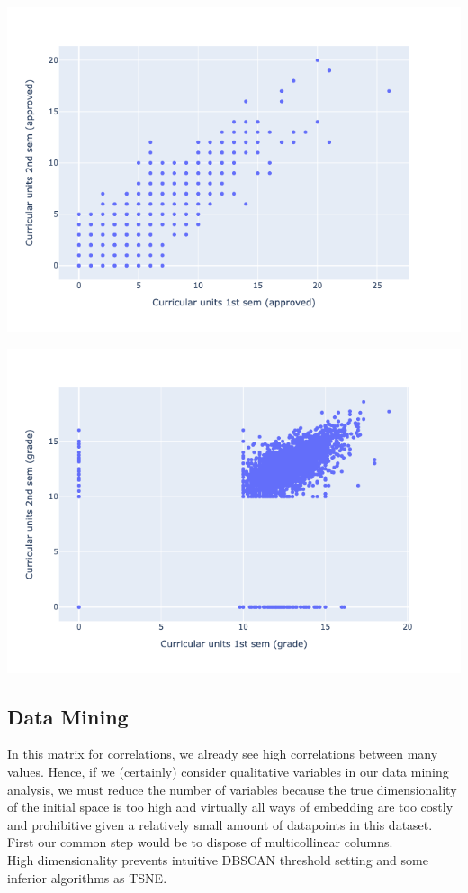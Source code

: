 \documentclass[
  letterpaper,
  DIV=11,
  numbers=noendperiod]{scrartcl}
\begin{document}
\includegraphics{report_AzadhdhinNedalYunisAlFraijat_files/figure-pdf/cell-56-output-1.png}

\includegraphics{report_AzadhdhinNedalYunisAlFraijat_files/figure-pdf/cell-57-output-1.png}

\hypertarget{data-mining}{%
\subsection{Data Mining}\label{data-mining}}

In this matrix for correlations, we already see high correlations
between many values. Hence, if we (certainly) consider qualitative
variables in our data mining analysis, we must reduce the number of
variables because the true dimensionality of the initial space is too
high and virtually all ways of embedding are too costly and prohibitive
given a relatively small amount of datapoints in this dataset. First our
common step would be to dispose of multicollinear columns.\\
High dimensionality prevents intuitive DBSCAN threshold setting and some
inferior algorithms as TSNE.
\end{document}
